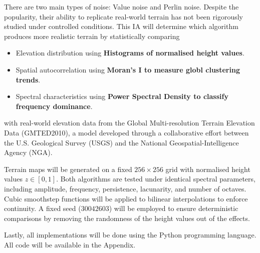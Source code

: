 There are two main types of noise: Value noise and Perlin noise. Despite the popularity, their ability to replicate real-world
terrain has not been rigorously studied under controlled conditions. This IA will determine which algorithm produces more realistic
terrain by statistically comparing
\begin{itemize}
    \item Elevation distribution using \textbf{Histograms of normalised height values}.
    \item Spatial autocorrelation using \textbf{Moran's I to measure globl clustering trends}.
    \item Spectral characteristics using \textbf{Power Spectral Density to classify frequency dominance}.
\end{itemize}
with real-world elevation data from the Global Multi-resolution Terrain Elevation Data (GMTED2010), a model developed through a
collaborative effort between the U.S. Geological Survey (USGS) and the National Geospatial-Intelligence Agency (NGA). 

Terrain maps will be generated on a fixed $256\times256$ grid with normalised height values $z\in[0,1]$. Both algorithms are tested
under identical spectral parameters, including amplitude, frequency, persistence, lacunarity, and number of octaves. Cubic smoothstep
functions will be applied to bilinear interpolations to enforce continuity. A fixed seed ($30042603$) will be employed to ensure deterministic
comparisons by removing the randomness of the height values out of the effects.

Lastly, all implementations will be done using the Python programming language. All code will be available in the Appendix.